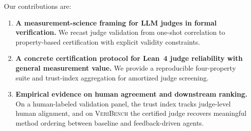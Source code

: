 Our contributions are:
\begin{enumerate}
\item \textbf{A measurement-science framing for LLM judges in formal verification.}
We recast judge validation from one-shot correlation to property-based certification with explicit validity constraints.
\item \textbf{A concrete certification protocol for Lean~4 judge reliability with general measurement value.}
We provide a reproducible four-property suite and trust-index aggregation for amortized judge screening.
\item \textbf{Empirical evidence on human agreement and downstream ranking.}
On a human-labeled validation panel, the trust index tracks judge-level human alignment, and on \textsc{VeriBench} the certified judge recovers meaningful method ordering between baseline and feedback-driven agents.
\end{enumerate}
